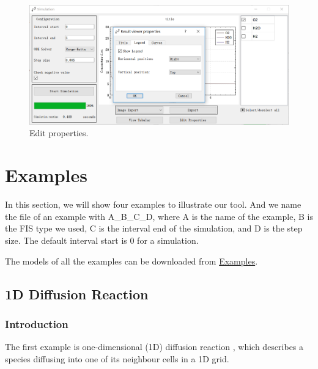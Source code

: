 \documentclass[journal,a4paper,onecolumn]{article}
\begin{document}
\begin{figure}[!hbt]
	\begin{center}
		\includegraphics[width=\columnwidth]{fig17}
		\caption{Edit properties.}
		\label{fig:Edit properties.}
	\end{center}
\end{figure}





\clearpage
\section{Examples}
In this section, we will show four examples to illustrate our tool. And we name the file of an example with A\_B\_C\_D, where A is the name of the example, B is the FIS type we used, C is the interval end of the simulation, and D is the step size. The default interval start is 0 for a simulation. 

The models of all the examples can be downloaded from \href{https://github.com/liufei2016/FCPN}{Examples}.


\subsection{1D Diffusion Reaction}

\subsubsection{Introduction}
The first example is one-dimensional (1D) diffusion reaction \cite{LBHY14}, which describes a species diffusing into one of its neighbour cells in a 1D grid.
\end{document}
